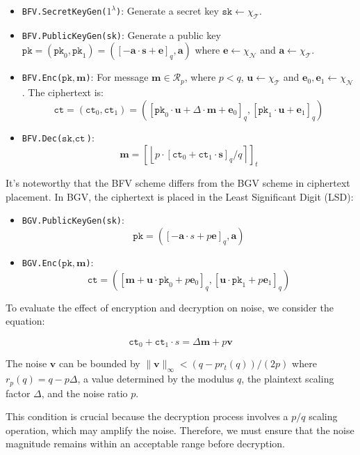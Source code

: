 \documentclass[11pt]{article}
\begin{document}
\begin{itemize}
\item \texttt{BFV.SecretKeyGen($1^\lambda$)}: Generate a secret key $\texttt{sk}\leftarrow \chi_\mathcal{T}$.
\item \texttt{BFV.PublicKeyGen(\texttt{sk})}: Generate a public key $\texttt{pk} =(\texttt{pk}_0,\texttt{pk}_1)= \left([-\mathbf{a}\cdot\mathbf{s}+\mathbf{e}]_{q}, \mathbf{a}\right)$ where $\mathbf{e}\leftarrow \chi_\mathcal{N}$ and $\mathbf{a}\leftarrow \chi_\mathcal{T}$.
\item \texttt{BFV.Enc($\texttt{pk},\mathbf{m}$)}: For message $\mathbf{m}\in \mathcal{R}_p$, where $p<q$, $\mathbf{u}\leftarrow \chi_\mathcal{T}$ and $\mathbf{e}_0, \mathbf{e}_1\leftarrow \chi_\mathcal{N}$. The ciphertext is:
    $$\texttt{ct} = (\texttt{ct}_0,\texttt{ct}_1)=\left([\texttt{pk}_0\cdot\mathbf{u}+\Delta\cdot\mathbf{m}+\mathbf{e}_0]_{q},[\texttt{pk}_1\cdot\mathbf{u}+\mathbf{e}_1]_{q}\right)$$
\item \texttt{BFV.Dec($\texttt{sk},\texttt{ct}$)}:
    $$\mathbf{m}=\left[\left\lfloor p\cdot[\texttt{ct}_0+\texttt{ct}_1\cdot\mathbf{s}]_q/q\right\rceil\right]_t$$
\end{itemize}

It's noteworthy that the BFV scheme differs from the BGV scheme in ciphertext placement. In BGV, the ciphertext is placed in the Least Significant Digit (LSD):

\begin{itemize}
\item \texttt{BGV.PublicKeyGen(\texttt{sk})}: $$\texttt{pk}=([-\mathbf{a}\cdot{s}+p\mathbf{e}]_q, \mathbf{a})$$
\item \texttt{BGV.Enc($\texttt{pk},\mathbf{m}$)}: $$\texttt{ct}=([ \mathbf{m}+\mathbf{u}\cdot\texttt{pk}_0+p\mathbf{e}_0]_q,[\mathbf{u}\cdot\texttt{pk}_1+p\mathbf{e}_1]_q)$$
\end{itemize}

To evaluate the effect of encryption and decryption on noise, we consider the equation:

\begin{equation}
\texttt{ct}_0+\texttt{ct}_1\cdot{s}=\Delta\mathbf{m}+p\mathbf{v}
\end{equation}

The noise $\mathbf{v}$ can be bounded by $\lVert\mathbf{v}\rVert_\infty < (q-p r_t(q))/(2p)$ where $r_p(q)=q-p\Delta$, a value determined by the modulus $q$, the plaintext scaling factor $\Delta$, and the noise ratio $p$.

This condition is crucial because the decryption process involves a $p/q$ scaling operation, which may amplify the noise. Therefore, we must ensure that the noise magnitude remains within an acceptable range before decryption.
\end{document}
